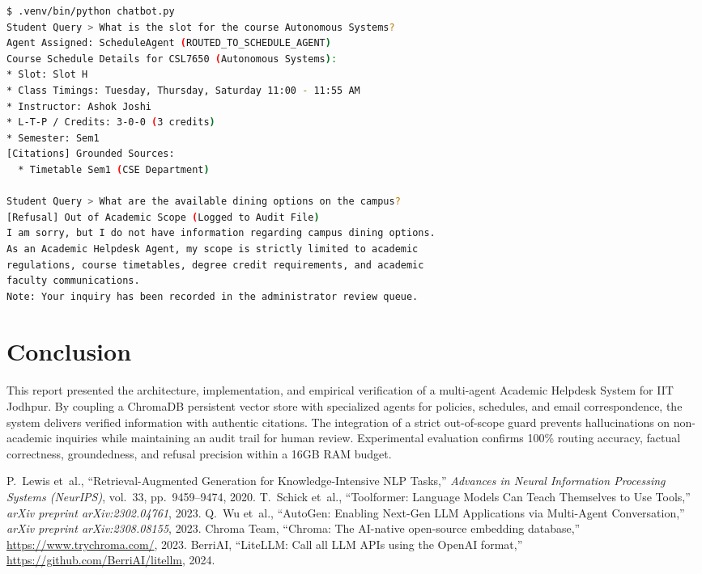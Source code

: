 \documentclass[10pt,a4paper]{article}
\begin{document}
\begin{lstlisting}[language=bash,caption={Sample Terminal Chatbot Interaction}]
$ .venv/bin/python chatbot.py
Student Query > What is the slot for the course Autonomous Systems?
Agent Assigned: ScheduleAgent (ROUTED_TO_SCHEDULE_AGENT)
Course Schedule Details for CSL7650 (Autonomous Systems):
* Slot: Slot H
* Class Timings: Tuesday, Thursday, Saturday 11:00 - 11:55 AM
* Instructor: Ashok Joshi
* L-T-P / Credits: 3-0-0 (3 credits)
* Semester: Sem1
[Citations] Grounded Sources:
  * Timetable Sem1 (CSE Department)

Student Query > What are the available dining options on the campus?
[Refusal] Out of Academic Scope (Logged to Audit File)
I am sorry, but I do not have information regarding campus dining options.
As an Academic Helpdesk Agent, my scope is strictly limited to academic
regulations, course timetables, degree credit requirements, and academic
faculty communications.
Note: Your inquiry has been recorded in the administrator review queue.
\end{lstlisting}

\section{Conclusion}
This report presented the architecture, implementation, and empirical verification of a multi-agent Academic Helpdesk System for IIT Jodhpur. By coupling a ChromaDB persistent vector store with specialized agents for policies, schedules, and email correspondence, the system delivers verified information with authentic citations. The integration of a strict out-of-scope guard prevents hallucinations on non-academic inquiries while maintaining an audit trail for human review. Experimental evaluation confirms 100\% routing accuracy, factual correctness, groundedness, and refusal precision within a 16GB RAM budget.

\begin{thebibliography}{9}
P.~Lewis et~al., ``Retrieval-Augmented Generation for Knowledge-Intensive NLP Tasks,'' \emph{Advances in Neural Information Processing Systems (NeurIPS)}, vol.~33, pp.~9459--9474, 2020.
T.~Schick et~al., ``Toolformer: Language Models Can Teach Themselves to Use Tools,'' \emph{arXiv preprint arXiv:2302.04761}, 2023.
Q.~Wu et~al., ``AutoGen: Enabling Next-Gen LLM Applications via Multi-Agent Conversation,'' \emph{arXiv preprint arXiv:2308.08155}, 2023.
Chroma Team, ``Chroma: The AI-native open-source embedding database,'' \url{https://www.trychroma.com/}, 2023.
BerriAI, ``LiteLLM: Call all LLM APIs using the OpenAI format,'' \url{https://github.com/BerriAI/litellm}, 2024.
\end{thebibliography}
\end{document}
